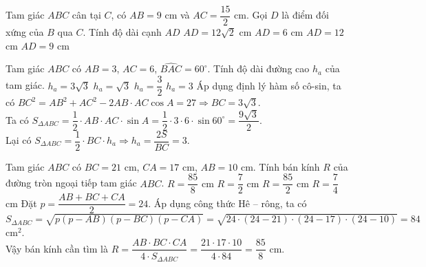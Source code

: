 \begin{ex}%
	Tam giác $ ABC$ cân tại $ C$, có $ AB=9$ cm và $ AC=\dfrac{15}{2}$ cm. Gọi $ D$ là điểm đối xứng của $ B$ qua $ C$. Tính độ dài cạnh $ AD$
	\choice
	{$ AD=12\sqrt{2}$ cm}
	{$ AD=6$ cm}
	{\True $ AD=12$ cm}
	{$ AD=9$ cm}
\end{ex}


\begin{ex}%
	Tam giác $ ABC$ có $ AB=3$, $AC=6$, $\widehat{BAC}=60^\circ $. Tính độ dài đường cao $ h_a$ của tam giác.
	\choice
	{$ h_a=3\sqrt{3}$}
	{$ h_a=\sqrt{3}$}
	{$ h_a=\dfrac{3}{2}$}
	{\True $ h_a=3$}
	\loigiai
	{Áp dụng định lý hàm số cô-sin, ta có
		$ BC^2=AB^2+AC^2-2AB\cdot AC\cos A=27\Rightarrow BC=3\sqrt{3}$.\\
		Ta có $ S_{\Delta ABC}=\dfrac{1}{2}\cdot AB\cdot AC\cdot \sin{A}=\dfrac{1}{2}\cdot 3\cdot 6\cdot \sin 60^\circ=\dfrac{9\sqrt{3}}{2}$.\\
		Lại có $ S_{\Delta ABC}=\dfrac{1}{2}\cdot BC\cdot h_a\Rightarrow h_a=\dfrac{2S}{BC}=3$.}
\end{ex}


\begin{ex}%
	Tam giác $ ABC$ có $ BC=21$ cm, $CA=17$ cm, $AB=10$ cm. Tính bán kính $ R$ của đường tròn ngoại tiếp tam giác $ ABC$.
	\choice
	{\True $ R=\dfrac{85}{8}$ cm}
	{$ R=\dfrac{7}{2}$ cm}
	{$ R=\dfrac{85}{2}$ cm}
	{$ R=\dfrac{7}{4}$ cm}
	\loigiai
	{Đặt $ p=\dfrac{AB+BC+CA}{2}=24$. Áp dụng công thức Hê – rông, ta có\\
		$ S_{\Delta ABC}=\sqrt{p(p-AB )(p-BC )(p-CA )}=\sqrt{24\cdot (24-21 )\cdot (24-17 )\cdot (24-10 )}=84$ cm$^2$. \\
		Vậy bán kính cần tìm là $ R=\dfrac{AB\cdot BC\cdot CA}{4\cdot S_{\Delta ABC}}=\dfrac{21\cdot 17\cdot 10}{4\cdot 84}=\dfrac{85}{8}$ cm.}
\end{ex}


